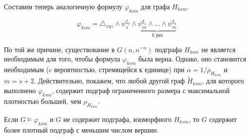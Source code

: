 Составим теперь аналогичную формулу $\varphi_{ksm}$ для графа $H_{ksm}$.

\[ \varphi_{ksm} =  \triangle_{xyz} \wedge \psi_{s}^{\xi_0} \wedge \underbrace{\psi_{m}^{\xi_1} \wedge \ldots \wedge \psi_{m}^{\xi_{k}}}_{\text{k раз}} \]



По той же причине, существование в $G(n, n^{-\alpha})$ подграфа $H_{ksm}$ не является необходимым для того, чтобы формула $\varphi_{ksm}$ была верна.
Однако, оно становится необходимым (c вероятностью, стремящейся к единице) при $\alpha = 1/\rho_{H_{ksm}}$ и $m = s+2$. 
Действительно, покажем, что любой другой граф $\tilde H_{ksm}$, для которого выполнено $\varphi_{ksm}$, содержит подграф ограниченного размера с максимальной плотностью большей, чем $\rho_{H_{ksm}}$.

\begin{Lem} 
\label{lem:min_ro_Hksm}
Если $G \vDash \varphi_{ksm}$ и $G$ не содержит подграфа, изоморфного $H_{ksm}$, то $G$ содержит более плотный подграф с меньшим числом вершин.
\end{Lem}

